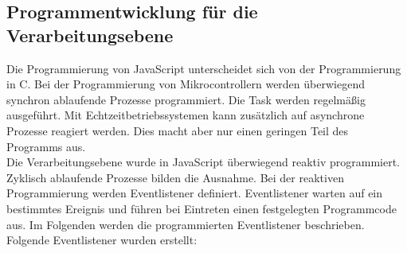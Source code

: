 \subsection{Programmentwicklung für die Verarbeitungsebene}
Die Programmierung von JavaScript unterscheidet sich von der Programmierung in C. Bei der Programmierung von Mikrocontrollern werden überwiegend synchron ablaufende Prozesse programmiert. Die Task werden regelmäßig ausgeführt. Mit Echtzeitbetriebssystemen kann zusätzlich auf asynchrone Prozesse reagiert werden. Dies macht aber nur einen geringen Teil des Programms aus.
\\
Die Verarbeitungsebene wurde in JavaScript überwiegend reaktiv programmiert. Zyklisch ablaufende Prozesse bilden die Ausnahme. Bei der reaktiven Programmierung werden Eventlistener definiert. Eventlistener warten auf ein bestimmtes Ereignis und führen bei Eintreten einen festgelegten Programmcode aus. Im Folgenden werden die programmierten Eventlistener beschrieben.
\\
Folgende Eventlistener wurden erstellt:
